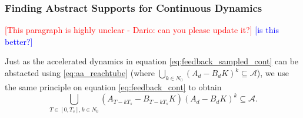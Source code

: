 \documentclass[twocolumn]{autart}    %
\newcommand{\mat}[1]{{#1}}
\begin{document}
 \subsubsection{Finding Abstract Supports for Continuous Dynamics}
 \label{sec:cont_aasup}

\textcolor{red}{[This paragraph is highly unclear - Dario: can you please update it?]}
\textcolor{blue}{[is  this better?]}

Just as the accelerated dynamics in equation \eqref{eq:feedback_sampled_cont} can be abstacted using \eqref{eq:aa_reachtube} (where $\bigcup_{k \in N_0} (\mat{A}_d-\mat{B}_d\mat{K}) ^k \subseteq \mathcal{A}$),
we use the same principle on equation \eqref{eq:feedback_cont} to obtain 
\begin{equation}\label{eq:aa_cont_amatrix}
\bigcup_{T \in [0, T_s], k \in N_0} (\mat{A}_{T-kT_s}-\mat{B}_{T-kT_s}\mat{K}) (\mat{A}_d-\mat{B}_d\mat{K})^k \subseteq \mathcal{A}.
\end{equation}
\end{document}
